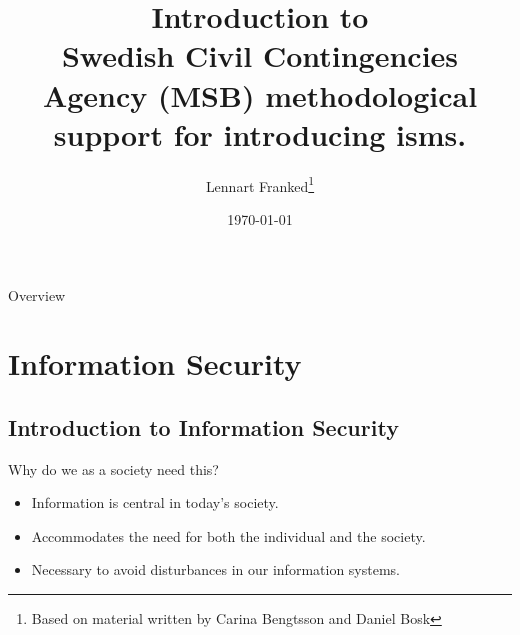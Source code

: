 \documentclass{beamer}
\title[Intro infosäk]{%
  Introduction to\\
  Swedish Civil Contingencies Agency (MSB) methodological support for introducing \ac{isms}.
}
\author{Lennart Franked\footnote{Based on material written by
    Carina Bengtsson and Daniel Bosk}}
\institute[MIUN IST]{%
  Department of Informationsystem and Technologies (IST),\\
  Mid Sweden University, Sundsvall.

}
\date{\today}
\begin{document}
\begin{frame}
  \titlepage{}
\end{frame}

\begin{frame}{Overview}
	\tableofcontents
\end{frame}

\section[Information Security]{Information Security}
\subsection{Introduction to Information Security}

\begin{frame}{Why do we as a society need this?}
  \begin{itemize}
    \item Information is central in today's society.
    \item Accommodates the need for both the individual and the society.
    \item Necessary to avoid disturbances in our information systems.
  \end{itemize}
\end{frame}
\end{document}
